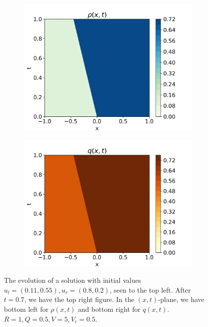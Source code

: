 \documentclass[10pt]{article}
\numberwithin{equation}{section}
\begin{document}
\begin{figure}[H]
\begin{subfigure}[b]{0.35\textwidth}
         \includegraphics[width=\textwidth]{Figures/Model/Plots/Sys2aRho.png}
     \end{subfigure}
     \begin{subfigure}[b]{0.35\textwidth}
         \centering
         \includegraphics[width=\textwidth]{Figures/Model/Plots/Sys2aQ.png}
     \end{subfigure}
        \caption{The evolution of a solution with initial values $u_l = (0.11, 0.55), u_r = (0.8, 0.2)$, seen to the top left. After $t = 0.7$, we have the top right figure. In the $(x,t)$-plane, we have bottom left for $\rho(x,t)$ and bottom right for $q(x,t)$. 
        $R = 1, Q = 0.5, V = 5, V_c = 0.5$.}
        \label{fig:Example2a}
\end{figure}
\end{document}

